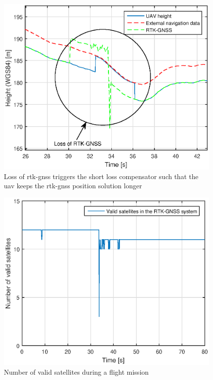 \begin{figure}[H]
\centering
\includegraphics[scale=0.7]{figs/Experiment/shortrtkloss1juni114124.eps}
\caption{Loss of \gls{rtk-gnss} triggers the short loss compensator such that the \gls{uav} keeps the \gls{rtk-gnss} position solution longer}
\label{Fig:ShortLoss}
\end{figure}
\begin{figure}[H]
\centering
\includegraphics[scale=0.7]{figs/Experiment/ShortrtklossSatellites1juni114124.eps}
\caption{Number of valid satellites during a flight mission}
\label{Fig:SatCount1juni114124}
\end{figure}

